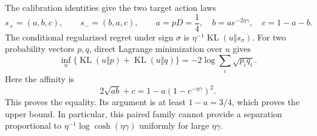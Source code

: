The calibration identities give the two target action laws
\[
s_+=(a,b,c),\qquad s_-=(b,a,c),\qquad a=pD=\frac14,\quad b=ae^{-2\eta\gamma},\quad c=1-a-b.
\]
The conditional regularized regret under sign \(\sigma\) is \(\eta^{-1}\operatorname{KL}(u\Vert s_\sigma)\). For two probability vectors \(p,q\), direct Lagrange minimization over \(u\) gives
\[
\inf_u\{\operatorname{KL}(u\Vert p)+\operatorname{KL}(u\Vert q)\}=-2\log\sum_i\sqrt{p_iq_i}.
\]
Here the affinity is
\[
2\sqrt{ab}+c=1-a(1-e^{-\eta\gamma})^2.
\]
This proves the equality. Its argument is at least \(1-a=3/4\), which proves the upper bound. In particular, this paired family cannot provide a separation proportional to \(\eta^{-1}\log\cosh(\eta\gamma)\) uniformly for large \(\eta\gamma\).